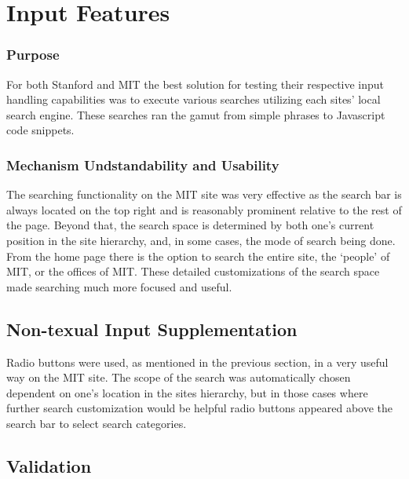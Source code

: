 \section*{Input Features}

\subsubsection*{Purpose}

For both Stanford and MIT the best solution for testing their respective input handling capabilities was to execute
various searches utilizing each sites' local search engine. These searches ran the gamut from simple phrases to 
Javascript code snippets.

\subsubsection*{Mechanism Undstandability and Usability}

            The searching functionality on the MIT site was very effective as the search
            bar is always located on the top right and is reasonably prominent relative
            to the rest of the page. Beyond that, the search space is determined by both
            one's current position in the site hierarchy, and, in some cases, the mode
            of search being done. From the home page there is the option to search the
            entire site, the `people' of MIT, or the offices of MIT. These detailed
            customizations of the search space made searching much more focused and useful.

\subsection*{Non-texual Input Supplementation}

            Radio buttons were used, as mentioned in the previous section, in a very useful
            way on the MIT site. The scope of the search was automatically chosen dependent
            on one's location in the sites hierarchy, but in those cases where further search
            customization would be helpful radio buttons appeared above the search bar to select
            search categories.
			
\subsection*{Validation}


